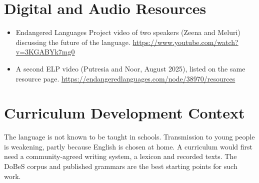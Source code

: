 \documentclass[12pt]{article}
\begin{document}
\section{Digital and Audio Resources}
\begin{itemize}
\item Endangered Languages Project video of two speakers (Zeena and Meluri) discussing the future of the language. \url{https://www.youtube.com/watch?v=3KGABYk7mg0}
\item A second ELP video (Putresia and Noor, August 2025), listed on the same resource page. \url{https://endangeredlanguages.com/node/38970/resources}
\end{itemize}

\section{Curriculum Development Context}
The language is not known to be taught in schools. Transmission to young people is weakening, partly because English is chosen at home. A curriculum would first need a community-agreed writing system, a lexicon and recorded texts. The DoBeS corpus and published grammars are the best starting points for such work.
\end{document}

